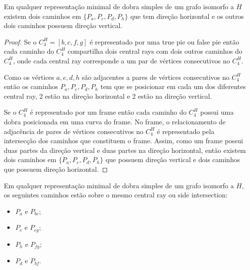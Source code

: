 \begin{lema}\label{lem:2vertical2horizontal}
Em qualquer representação minimal de dobra simples de um grafo isomorfo a $H$ existem dois caminhos em   $\{P_a, P_e, P_d, P_h \}$ que tem direção horizontal e os outros dois caminhos possuem direção vertical.
\end{lema}

\begin{proof}
Se o $C_4^{H} = [b,c,f,g]$ é representado por uma true pie ou false pie então cada caminho do  $C_4^{H}$ compartilha dois central rays com dois outros caminhos do  $C_4^{H}$, onde cada central ray corresponde a um par de vértices consecutivos no $C_4^{H}$.

Como os vértices  $a, e, d, h$ são adjacentes a pares de vértices consecutivos no $C_4^{H}$ então os caminhos $P_a, P_e, P_d, P_h$ tem que se posicionar em cada um dos diferentes central ray,  2 estão na direção horizontal e 2 estão na direção vertical.

Se o $C_4^{H}$ é representado por um frame então cada caminho do $C_4^{H}$ possui uma dobra posicionada em uma curva do frame. No frame, o relacionamento de adjacência de pares de vértices consecutivos no $C_4^{H}$ é representado pela intersecção dos caminhos que constituem o frame. Assim, como um frame possui duas partes da direção vertical e duas partes na direção horizontal, então existem dois caminhos em $\{P_a, P_e, P_d, P_h\}$ que possuem direção vertical e dois caminhos que possuem direção horizontal.
 \end{proof}

\begin{corollary}
 \label{coro:paresMesmoSegmento}
Em qualquer representação minimal de dobra simples de um grafo isomorfo a $H$, os seguintes caminhos estão sobre o mesmo central ray ou side intersection: %

\begin{itemize}
\item $P_a$ e $P_{bc}$;
\item $P_e$ e $P_{cg}$;
\item $P_h$ e $P_{fg}$;
\item $P_d$ e $P_{bf}$.
\end{itemize}
\end{corollary}





